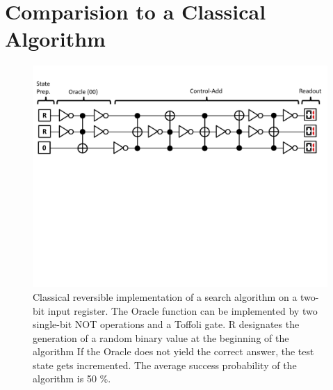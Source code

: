 \section{Comparision to a Classical Algorithm}

\begin{figure}[ht!]
	\centering
		\includegraphics[width=1.0\textwidth]{"./material/papers/grover/classical_reversible_algorithm"}
	\caption{Classical reversible implementation of a search algorithm on a two-bit input register. The Oracle function can be implemented by two single-bit NOT operations and a Toffoli gate. R designates the generation of a random binary value at the beginning of the algorithm If the Oracle does not yield the correct answer, the test state gets incremented. The average success probability of the algorithm is 50 \%.}
	\label{fig:GroverClassicalReversibleAlgorithm}
\end{figure}

